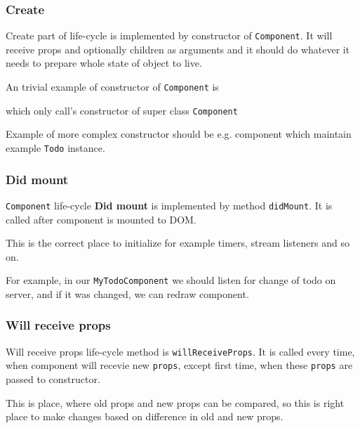     \subsubsection{Create}\label{subsec:our-architecture-lifecycle-create}

      Create part of life-cycle is implemented by constructor of \texttt{Component}. 
      It will receive props and optionally children as arguments and 
      it should do whatever it needs to prepare whole state of object to live.

      An trivial example of constructor of \texttt{Component} is 
      
      which only call's constructor of super class \texttt{Component}

      Example of more complex constructor should be e.g. component 
      which maintain example \texttt{Todo} instance.
      

    \subsubsection{Did mount}\label{subsec:our-architecture-lifecycle-didmount}

      \texttt{Component} life-cycle \textbf{Did mount} is implemented by method \texttt{didMount}. 
      It is called after component is mounted to DOM. 

      This is the correct place to initialize for example timers, stream listeners and so on. 

      For example, in our \texttt{MyTodoComponent} we should listen for change of todo on server, 
      and if it was changed, we can redraw component.
      

    \subsubsection{Will receive props}\label{subsec:our-architecture-lifecycle-willreceiveprops}

      Will receive props life-cycle method is \texttt{willReceiveProps}. 
      It is called every time, when component will recevie new \texttt{props}, 
      except first time, when these \texttt{props} are passed to constructor.

      This is place, where old props and new props can be compared, 
      so this is right place to make changes based on difference in old and new props.

